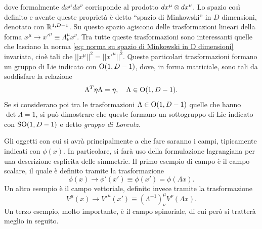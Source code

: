 dove formalmente $dx^\mu dx^\nu$ corrisponde al prodotto $dx^\mu \otimes dx^\nu$. Lo spazio così definito e avente queste proprietà è detto ``spazio di Minkowski'' in $D$ dimensioni, denotato con $\mathbb{R}^{1,D - 1}$. Su questo spazio agiscono delle trasformazioni lineari della forma $x^\mu \to x'^\mu \equiv \Lambda^\mu_\nu x^\nu$. Tra tutte queste trasformazioni sono interessanti quelle che lasciano la norma \eqref{eq: norma su spazio di Minkowski in D dimensioni} invariata, cioè tali che $||x^\mu||^2 = ||x'^\mu||^2$. Queste particolari trasformazioni formano un gruppo di Lie indicato con $\mathrm{O}(1, D - 1)$, dove, in forma matriciale, sono tali da soddisfare la relazione
\begin{equation}
    \Lambda^T\eta\Lambda = \eta,\quad \Lambda \in \mathrm{O}(1, D - 1).
\end{equation}
Se si considerano poi tra le trasformazioni $\Lambda \in \mathrm{O}(1, D - 1)$ quelle che hanno $\det{\Lambda} = 1$, si può dimostrare che queste formano un sottogruppo di Lie indicato con $\mathrm{SO}(1, D - 1)$ e detto \emph{gruppo di Lorentz}. 

Gli oggetti con cui si avrà principalmente a che fare saranno i campi, tipicamente indicati con $\phi(x)$. In particolare, si farà uso della formulazione lagrangiana per una descrizione esplicita delle simmetrie. Il primo esempio di campo è il campo scalare, il quale è definito tramite la trasformazione 
\begin{equation}
    \phi(x) \to \phi'(x') \equiv \phi(x') = \phi(\Lambda x).
\end{equation}
Un altro esempio è il campo vettoriale, definito invece tramite la trasformazione
\begin{equation}
    V^\mu(x) \to V'^\mu(x') \equiv (\Lambda^{-1})^\mu_\nu V^\nu(\Lambda x).
\end{equation}
Un terzo esempio, molto importante, è il campo spinoriale, di cui però si tratterà meglio in seguito. 


